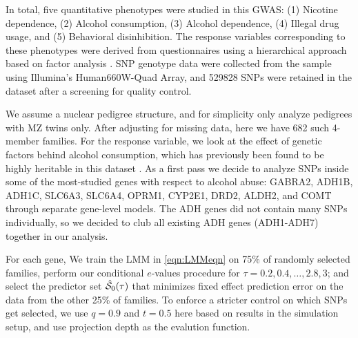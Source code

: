 In total, five quantitative phenotypes were studied in this GWAS: (1) Nicotine dependence, (2) Alcohol consumption, (3) Alcohol dependence, (4) Illegal drug usage, and (5) Behavioral disinhibition. The response variables corresponding to these phenotypes were derived from questionnaires using a hierarchical approach based on factor analysis \citep{HicksEtal11}. SNP genotype data were collected from the sample using Illumina’s Human660W-Quad Array, and 529828 SNPs were retained in the dataset after a screening for quality control.

We assume a nuclear pedigree structure, and for simplicity only analyze pedigrees with MZ twins only. After adjusting for missing data, here we have 682 such 4-member families. For the response variable, we look at the effect of genetic factors behind alcohol consumption, which has previously been found to be highly heritable in this dataset \citep{McGueEtal13}. As a first pass we decide to analyze SNPs inside some of the most-studied genes with respect to alcohol abuse: GABRA2, ADH1B, ADH1C, SLC6A3, SLC6A4, OPRM1, CYP2E1, DRD2, ALDH2, and COMT \citep{CoombesThesis16} through separate gene-level models. The ADH genes did not contain many SNPs individually, so we decided to club all existing ADH genes (ADH1-ADH7) together in our analysis.

For each gene, We train the LMM in \ref{eqn:LMMeqn} on 75\% of randomly selected families, perform our conditional $e$-values procedure for $\tau = 0.2, 0.4, \ldots, 2.8, 3$; and select the predictor set $\hat {{\cal{S}}}_0 (\tau) $ that minimizes fixed effect prediction error on the data from the other 25\% of families. To enforce a stricter control on which SNPs get selected, we use $q=0.9$ and $t=0.5$ here based on results in the simulation setup, and use projection depth as the evalution function.

